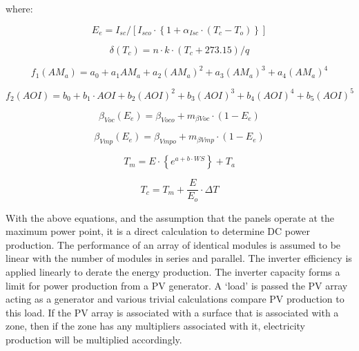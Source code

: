where:

\begin{equation}
{E_e} = {I_{sc}}/\left[ {{I_{sco}} \cdot \left\{ {1 + {\alpha_{Isc}} \cdot ({T_c} - {T_o})} \right\}} \right]
\end{equation}

\begin{equation}
\delta ({T_c}) = n \cdot k \cdot ({T_c} + 273.15)/q
\end{equation}

\begin{equation}
{f_1}\left( {A{M_a}} \right) = {a_0} + {a_1}A{M_a} + {a_2}{\left( {A{M_a}} \right)^2} + {a_3}{\left( {A{M_a}} \right)^3} + {a_4}{\left( {A{M_a}} \right)^4}
\end{equation}

\begin{equation}
{f_2}\left( {AOI} \right) = {b_0} + {b_1} \cdot AOI + {b_2}{\left( {AOI} \right)^2} + {b_3}{\left( {AOI} \right)^3} + {b_4}{\left( {AOI} \right)^4} + {b_5}{\left( {AOI} \right)^5}
\end{equation}

\begin{equation}
{\beta_{Voc}}({E_e}) = {\beta_{Voco}} + {m_{\beta Voc}} \cdot (1 - {E_e})
\end{equation}

\begin{equation}
{\beta_{Vmp}}({E_e}) = {\beta_{Vmpo}} + {m_{\beta Vmp}} \cdot (1 - {E_e})
\end{equation}

\begin{equation}
{T_m} = E \cdot \left\{ {{e^{a + b \cdot WS}}} \right\} + {T_a}
\end{equation}

\begin{equation}
{T_c} = {T_m} + \frac{E}{{{E_o}}} \cdot \Delta T
\end{equation}

With the above equations, and the assumption that the panels operate at the maximum power point, it is a direct calculation to determine DC power production. The performance of an array of identical modules is assumed to be linear with the number of modules in series and parallel. The inverter efficiency is applied linearly to derate the energy production. The inverter capacity forms a limit for power production from a PV generator. A `load' is passed the PV array acting as a generator and various trivial calculations compare PV production to this load. If the PV array is associated with a surface that is associated with a zone, then if the zone has any multipliers associated with it, electricity production will be multiplied accordingly.

